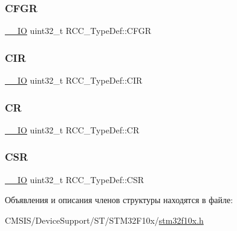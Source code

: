 \mbox{\label{struct_r_c_c___type_def_a0721b1b729c313211126709559fad371}} 
\subsubsection{\texorpdfstring{CFGR}{CFGR}}
{\footnotesize\ttfamily \mbox{\hyperlink{group___c_m_s_i_s___c_m3__core__definitions_gaec43007d9998a0a0e01faede4133d6be}{\+\_\+\+\_\+\+IO}} uint32\+\_\+t R\+C\+C\+\_\+\+Type\+Def\+::\+C\+F\+GR}

\mbox{\label{struct_r_c_c___type_def_aeadf3a69dd5795db4638f71938704ff0}} 
\subsubsection{\texorpdfstring{CIR}{CIR}}
{\footnotesize\ttfamily \mbox{\hyperlink{group___c_m_s_i_s___c_m3__core__definitions_gaec43007d9998a0a0e01faede4133d6be}{\+\_\+\+\_\+\+IO}} uint32\+\_\+t R\+C\+C\+\_\+\+Type\+Def\+::\+C\+IR}

\mbox{\label{struct_r_c_c___type_def_abcb9ff48b9afb990283fefad0554b5b3}} 
\subsubsection{\texorpdfstring{CR}{CR}}
{\footnotesize\ttfamily \mbox{\hyperlink{group___c_m_s_i_s___c_m3__core__definitions_gaec43007d9998a0a0e01faede4133d6be}{\+\_\+\+\_\+\+IO}} uint32\+\_\+t R\+C\+C\+\_\+\+Type\+Def\+::\+CR}

\mbox{\label{struct_r_c_c___type_def_a7e913b8bf59d4351e1f3d19387bd05b9}} 
\subsubsection{\texorpdfstring{CSR}{CSR}}
{\footnotesize\ttfamily \mbox{\hyperlink{group___c_m_s_i_s___c_m3__core__definitions_gaec43007d9998a0a0e01faede4133d6be}{\+\_\+\+\_\+\+IO}} uint32\+\_\+t R\+C\+C\+\_\+\+Type\+Def\+::\+C\+SR}



Объявления и описания членов структуры находятся в файле\+:\begin{DoxyCompactItemize}
\item 
C\+M\+S\+I\+S/\+Device\+Support/\+S\+T/\+S\+T\+M32\+F10x/\mbox{\hyperlink{stm32f10x_8h}{stm32f10x.\+h}}\end{DoxyCompactItemize}
